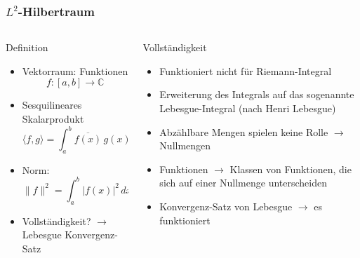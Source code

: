 %
%
%
\bgroup
\begin{frame}[t]
\setlength{\abovedisplayskip}{5pt}
\setlength{\belowdisplayskip}{5pt}
\frametitle{$L^2$-Hilbertraum}
\vspace{-20pt}
\begin{columns}[t,onlytextwidth]
\begin{column}{0.48\textwidth}
\begin{block}{Definition}
\begin{itemize}
\item
Vektorraum: Funktionen
\[
f\colon [a,b] \to \mathbb{C}
\]
\item
Sesquilineares Skalarprodukt
\[
\langle f,g\rangle
=
\int_a^b \overline{f(x)}\, g(x) \,dx
\]
\item
Norm:
\[
\|f\|^2 = \int_a^b |f(x)|^2\,dx
\]
\item Vollständigkeit?
$\rightarrow$
Lebesgue Konvergenz-Satz
\end{itemize}
\end{block}
\end{column}
\begin{column}{0.48\textwidth}
\begin{block}{Vollständigkeit}
\begin{itemize}
\item
Funktioniert nicht für Riemann-Integral
\item
Erweiterung des Integrals auf das sogenannte Lebesgue-Integral (nach
Henri Lebesgue)
\item
Abzählbare Mengen spielen keine Rolle $\rightarrow$ Nullmengen
\item
Funktionen $\rightarrow$ Klassen von Funktionen, die sich auf einer Nullmenge
unterscheiden
\item
Konvergenz-Satz von Lebesgue $\rightarrow$ es funktioniert
\end{itemize}
\end{block}
\end{column}
\end{columns}
\end{frame}
\egroup
